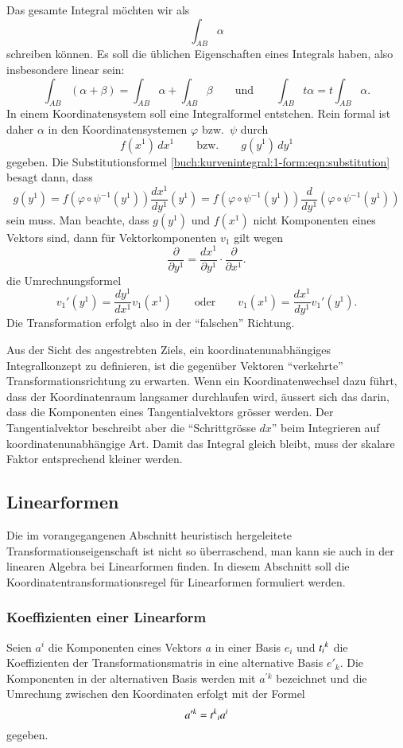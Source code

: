 Das gesamte Integral möchten wir als
\[
\int_{AB} \alpha
\]
schreiben können.
Es soll die üblichen Eigenschaften eines Integrals haben, also
insbesondere linear sein:
\[
\int_{AB}
(\alpha + \beta)
=
\int_{AB}
\alpha
+
\int_{AB}
\beta
\qquad\text{und}\qquad
\int_{AB}
t
\alpha
=
t
\int_{AB}
\alpha.
\]
In einem Koordinatensystem soll eine Integralformel entstehen.
Rein formal ist daher $\alpha$ in den Koordinatensystemen $\varphi$
bzw.~$\psi$ durch
\[
f(x^1)\,dx^1
\qquad
\text{bzw.}
\qquad
g(y^1)\,dy^1
\]
gegeben.
Die Substitutionsformel
\eqref{buch:kurvenintegral:1-form:eqn:substitution}
besagt dann, dass
\[
g(y^1)
= 
f(\varphi\circ\psi^{-1}(y^1))
\frac{dx^1}{dy^1}(y^1)
=
f(\varphi\circ\psi^{-1}(y^1))
\frac{d}{dy^1}(\varphi\circ\psi^{-1}(y^1))
\]
sein muss.
Man beachte, dass $g(y^1)$ und $f(x^1)$ nicht Komponenten eines
Vektors sind, dann für Vektorkomponenten $v_1$ gilt wegen
\[
\frac{\partial}{\partial y^1}
=
\frac{dx^1}{\partial y^1}\cdot \frac{\partial }{\partial x^1}.
\]
die Umrechnungsformel
\[
v_1'(y^1)
=
\frac{dy^1}{dx^1}
v_1(x^1)
\qquad\text{oder}\qquad
v_1(x^1)
=
\frac{dx^1}{dy^1} v_1'(y^1).
\]
Die Transformation erfolgt also in der ``falschen'' Richtung.

Aus der Sicht des angestrebten Ziels, ein koordinatenunabhängiges
Integralkonzept zu definieren, ist die gegenüber Vektoren ``verkehrte''
Transformationsrichtung zu erwarten.
Wenn ein Koordinatenwechsel dazu führt, dass der Koordinatenraum
langsamer durchlaufen wird, äussert sich das darin, dass die Komponenten
eines Tangentialvektors grösser werden.
Der Tangentialvektor beschreibt aber die ``Schrittgrösse $dx$'' beim
Integrieren auf koordinatenunabhängige Art.
Damit das Integral gleich bleibt, muss der skalare Faktor entsprechend
kleiner werden.

%
%
\subsection{Linearformen
\label{buch:kurvenintegral:1formen:subsection:linearformen}}
Die im vorangegangenen Abschnitt heuristisch hergeleitete
Transformationseigenschaft ist nicht so überraschend, man kann sie
auch in der linearen Algebra bei Linearformen finden.
%
In diesem Abschnitt soll die Koordinatentransformationsregel für
Linearformen formuliert werden.

%
%
\subsubsection{Koeffizienten einer Linearform}
Seien $a^i$ die Komponenten eines Vektors $a$ in einer Basis $e_i$ und
$t_{i}\mathstrut ^k$ die Koeffizienten der Transformationsmatris
in eine alternative Basis $e'_k$.
Die Komponenten in der alternativen Basis werden mit $a^{\prime k}$
bezeichnet und die Umrechung zwischen den Koordinaten erfolgt mit der
Formel
\begin{equation}
a^{\prime k}
=
t^k\mathstrut_i a^i
\label{buch:kurvenintegral:1formen:linearformen:vektor}
\end{equation}
gegeben.

